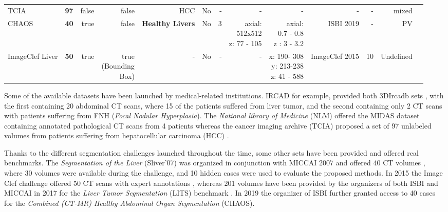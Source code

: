 \documentclass[]{article}
\begin{document}
\begin{landscape}
\begin{table}[!htp]
\begin{tabular}{lrrrrrrrrrrrr}
				TCIA &\textbf{97} &false &false &HCC &No &- &- &- &- &- &mixed\\
				CHAOS &\textbf{40} & true &false &\textbf{\parbox{1.5cm}{Healthy Livers}} &No &3 &\parbox{1.5cm}{axial:\\512x512\\z: 77 - 105} &\parbox{1.5cm}{axial:\\0.7 - 0.8\\z : 3 - 3.2}&ISBI 2019 &- &PV \\
				\parbox{0.8cm}{ImageClef Liver} &\textbf{50} &true &\parbox[r]{1cm}{true\\(Bounding\\Box)} &- &No &- &- & \parbox{1.5cm}{x: 190- 308\\y: 213-238\\z: 41 - 588} &ImageClef 2015 &10 & Undefined \\
				\bottomrule
			\end{tabular}
		\end{table}
	\end{landscape}
	
	
	Some of the available datasets have been launched by medical-related
	institutions. IRCAD for example, provided both 3DIrcadb sets \cite{3DIrcadB}, with the first containing 20 abdominal CT
	scans, where 15 of the patients suffered from liver tumor, and the
	second containing only 2 CT scans with patients suffering from FNH
	(\emph{Focal Nodular Hyperplasia}).
	The \emph{National library of Medicine} (NLM) offered the MIDAS dataset
	containing annotated pathological CT scans from 4 patients \cite{MIDAS} whereas the cancer imaging archive (TCIA)
	proposed a set of 97 unlabeled volumes from patients suffering from
	hepatocellular carcinoma (HCC) \cite{Clark2013}.
	
	Thanks to the different segmentation challenges launched throughout the
	time, some other sets have been provided and offered real benchmarks.
	The \emph{Segmentation of the Liver} (Sliver'07) was organized in
	conjunction with MICCAI 2007 and offered 40 CT volumes \cite{VanGinneken2007}, where 30
	volumes were available during the challenge, and 10 hidden cases were
	used to evaluate the proposed methods. In 2015 the Image Clef challenge
	offered 50 CT scans with expert annotations \cite{ImageClef}, whereas 201 volumes have been provided by the organizers
	of both ISBI and MICCAI in 2017 for the \emph{Liver Tumor Segmentation}
	(LITS) benchmark \cite{Bilic2019}. In 2019 the organizer of ISBI
	further granted access to 40 cases for the \emph{Combined (CT-MR)
		Healthy Abdominal Organ Segmentation} (CHAOS)\cite{CHAOS}.
	
\end{document}
